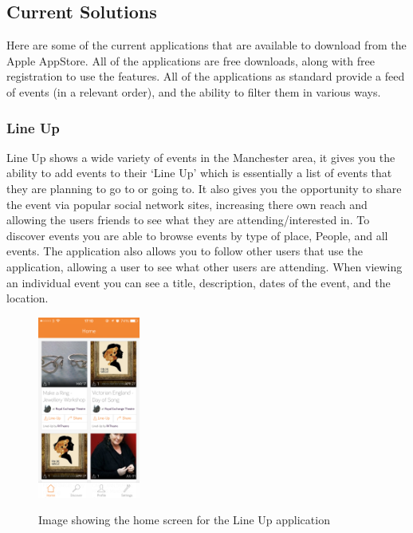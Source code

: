 	\subsection{Current Solutions}
		Here are some of the current applications that are available to download from the Apple AppStore. All of the applications are free downloads, along with free registration to use the features. All of the applications as standard provide a feed of events (in a relevant order), and the ability to filter them in various ways. 

		\subsubsection{Line Up}
			Line Up\cite{lineup} shows a wide variety of events in the Manchester area, it gives you the ability to add events to their `Line Up' which is essentially a list of events that they are planning to go to or going to. It also gives you the opportunity to share the event via popular social network sites, increasing there own reach and allowing the users friends to see what they are attending/interested in. To discover events you are able to browse events by type of place, People, and all events. The application also allows you to follow other users that use the application, allowing a user to see what other users are attending. When viewing an individual event you can see a title, description, dates of the event, and the location. 
			
			\begin{figure}[ht] %
				\caption[Line Up home screen]{Image showing the home screen for the Line Up application }
				\centering
				\includegraphics[width=0.3\textwidth]{Images/lineup}
				\label{fig:lineup}
			\end{figure}

